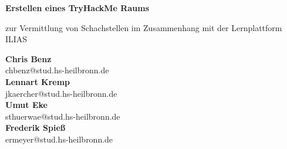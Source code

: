 \documentclass[10pt, a4paper,onecolumn ,titlepage]{article}
\begin{document}
    \begin{titlepage}
        \begin{center}

            \vspace*{1cm}

            {\large \textbf{Erstellen eines TryHackMe Raums}}

            \vspace{0.5cm}
            zur Vermittlung von Schachstellen im Zusammenhang mit der Lernplattform ILIAS

            \vspace{1.5cm}

            \textbf{Chris Benz} \\
            \small{chbenz@stud.hs-heilbronn.de}
            \\
            \vspace{0.2cm}
            \textbf{Lennart Kremp}\\
            \small{jkaercher@stud.hs-heilbronn.de}
            \\
            \vspace{0.2cm}
            \textbf{Umut Eke} \\
            \small{sthuerwae@stud.hs-heilbronn.de}
            \\
            \vspace{0.2cm}
            \textbf{Frederik Spieß}\\
            \small{ermeyer@stud.hs-heilbronn.de}


            \vfill


\end{center}
\end{titlepage}
\end{document}
